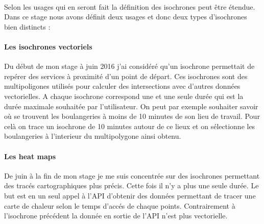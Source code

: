 \documentclass[a4paper]{report}
\begin{document}
\paragraph{} Selon les usages qui en seront fait la définition des isochrones peut être étendue. Dans ce stage nous avons définit deux usages et donc deux types d'isochrones bien distincts : 

\paragraph{Les isochrones vectoriels} Du début de mon stage à juin 2016 j'ai considéré qu'un isochrone permettait de repérer des services à proximité d'un point de départ. Ces isochrones sont des multipoligones utilisés pour calculer des intersections avec d'autres données vectorielles. A chaque isochrone correspond une et une seule durée qui est la durée maximale souhaitée par l'utilisateur. On peut par exemple souhaiter savoir où se trouvent les boulangeries à moins de 10 minutes de son lieu de travail. Pour celà on trace un isochrone de 10 minutes autour de ce lieux et on sélectionne les boulangeries à l'interieur du multipolygone ainsi obtenu.

\paragraph{Les  heat maps} De juin à la fin de mon stage je me suis concentrée sur des isochrones permettant des tracés cartographiques plus précis. Cette fois il n'y a plus une seule durée. Le but est en un seul appel à l'API d'obtenir des données permettant de tracer une carte de chaleur selon le temps d'accés de chaque points. Contrairement à l'isochrone précédent la donnée en sortie de l'API n'est plus vectorielle.
\end{document}
